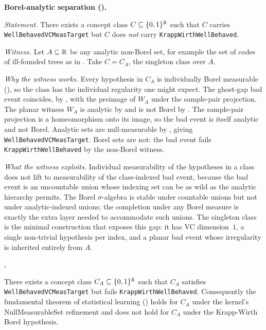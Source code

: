 \begin{separation}
\textbf{Borel-analytic separation
().}

\medskip\noindent
\emph{Statement.} There exists a concept class $C \subseteq \{0,1\}^{\mathbb{R}}$
such that $C$ carries \texttt{WellBehavedVCMeasTarget} but $C$ does
\emph{not} carry \texttt{KrappWirthWellBehaved}.

\medskip\noindent
\emph{Witness.}
Let $A \subseteq \mathbb{R}$ be any analytic non-Borel set, for example the
set of codes of ill-founded trees as in
. Take $C = C_A$, the singleton class over
$A$.

\medskip\noindent
\emph{Why the witness works.}  Every hypothesis in $C_A$ is
individually Borel measurable
(), so the class has the
individual regularity one might expect.  The ghost-gap bad event
coincides, by
, with the preimage of $W_A$ under the
sample-pair projection.  The planar witness $W_A$ is analytic by
 and is not Borel by
.  The sample-pair projection is a
homeomorphism onto its image, so the bad event is itself analytic and
not Borel.  Analytic sets are null-measurable by
, giving
\texttt{WellBehavedVCMeasTarget}.  Borel sets are not: the bad event
fails \texttt{KrappWirthWellBehaved} by the non-Borel witness.

\medskip\noindent
\emph{What the witness exploits.}  Individual measurability of the
hypotheses in a class does not lift to measurability of the
class-indexed bad event, because the bad event is an uncountable union
whose indexing set can be as wild as the analytic hierarchy permits.
The Borel $\sigma$-algebra is stable under countable unions but not
under analytic-indexed unions; the completion under any Borel measure
is exactly the extra layer needed to accommodate such unions.  The
singleton class is the minimal construction that exposes this gap: it
has VC dimension~$1$, a single non-trivial hypothesis per index, and a
planar bad event whose irregularity is inherited entirely from $A$.

\hfill\cite{KrappWirth2024},\,\cite{Kechris1995}
\end{separation}

\begin{cor}
\label{cor:borel-analytic-separation}
  \leanok
There exists a concept class $C_A \subseteq \{0,1\}^{\mathbb{R}}$ such that
$C_A$ satisfies \texttt{WellBehavedVCMeasTarget} but fails
\texttt{KrappWirthWellBehaved}. Consequently the fundamental theorem
of statistical learning () holds for $C_A$ under
the kernel's NullMeasurableSet refinement and does not hold for
$C_A$ under the Krapp-Wirth Borel hypothesis.
\end{cor}


